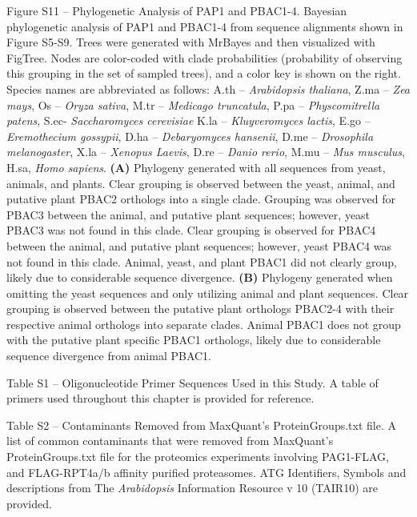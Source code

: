 Figure S11 – Phylogenetic Analysis of PAP1 and PBAC1-4. Bayesian phylogenetic analysis of PAP1 and PBAC1-4 from sequence alignments shown in Figure S5-S9. Trees were generated with MrBayes \citep{ronquist12} and then visualized with FigTree. Nodes are color-coded with clade probabilities (probability of observing this grouping in the set of sampled trees), and a color key is shown on the right. Species names are abbreviated as follows: A.th – \textit{Arabidopsis thaliana}, Z.ma – \textit{Zea mays}, Os – \textit{Oryza sativa}, M.tr – \textit{Medicago truncatula}, P.pa – \textit{Physcomitrella patens}, S.ec- \textit{Saccharomyces cerevisiae} K.la – \textit{Kluyveromyces lactis}, E.go – \textit{Eremothecium gossypii}, D.ha – \textit{Debaryomyces hansenii}, D.me – \textit{Drosophila melanogaster}, X.la – \textit{Xenopus Laevis}, D.re – \textit{Danio rerio}, M.mu – \textit{Mus musculus}, H.sa, \textit{Homo sapiens}. \textbf{(A)} Phylogeny generated with all sequences from yeast, animals, and plants. Clear grouping is observed between the yeast, animal, and putative plant PBAC2 orthologs into a single clade. Grouping was observed for PBAC3 between the animal, and putative plant sequences; however, yeast PBAC3 was not found in this clade. Clear grouping is observed for PBAC4 between the animal, and putative plant sequences; however, yeast PBAC4 was not found in this clade. Animal, yeast, and plant PBAC1 did not clearly group, likely due to considerable sequence divergence. \textbf{(B)} Phylogeny generated when omitting the yeast sequences and only utilizing animal and plant sequences. Clear grouping is observed between the putative plant orthologs PBAC2-4 with their respective animal orthologs into separate clades. Animal PBAC1 does not group with the putative plant specific PBAC1 orthologs, likely due to considerable sequence divergence from animal PBAC1.

Table S1 – Oligonucleotide Primer Sequences Used in this Study. A table of primers used throughout this chapter is provided for reference.

Table S2 – Contaminants Removed from MaxQuant’s ProteinGroups.txt file. A list of common contaminants that were removed from MaxQuant’s ProteinGroups.txt file for the proteomics experiments involving PAG1-FLAG, and FLAG-RPT4a/b affinity purified proteasomes.  ATG Identifiers, Symbols and descriptions from The \textit{Arabidopsis} Information Resource v 10 (TAIR10) are provided.

